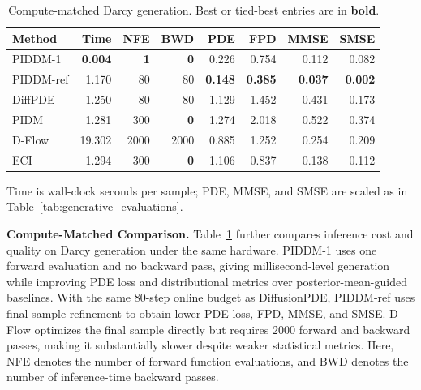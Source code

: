 \documentclass{article}
\theoremstyle{plain}
\theoremstyle{definition}
\theoremstyle{remark}
\begin{document}
\begin{table}[t]
\centering
\renewcommand{\arraystretch}{1.08}
\caption{Compute-matched Darcy generation. Best or tied-best entries are in \textbf{bold}.}
\label{tab:compute_matched}
\begin{tabular}{@{}lrrrrrrr@{}}
\toprule
Method & Time & NFE & BWD & PDE & FPD & MMSE & SMSE \\
\midrule
PIDDM-1 & \bfseries 0.004 & \bfseries 1 & \bfseries 0 & 0.226 & 0.754 & 0.112 & 0.082 \\
PIDDM-ref & 1.170 & 80 & 80 & \bfseries 0.148 & \bfseries 0.385 & \bfseries 0.037 & \bfseries 0.002 \\
DiffPDE & 1.250 & 80 & 80 & 1.129 & 1.452 & 0.431 & 0.173 \\
PIDM & 1.281 & 300 & \bfseries 0 & 1.274 & 2.018 & 0.522 & 0.374 \\
D-Flow & 19.302 & 2000 & 2000 & 0.885 & 1.252 & 0.254 & 0.209 \\
ECI & 1.294 & 300 & \bfseries 0 & 1.106 & 0.837 & 0.138 & 0.112 \\
\bottomrule
\end{tabular}
\par\vspace{1mm}
\begin{minipage}{\columnwidth}
\footnotesize Time is wall-clock seconds per sample; PDE, MMSE, and SMSE are scaled as in Table~\ref{tab:generative_evaluations}.
\end{minipage}
\end{table}

\noindent\textbf{Compute-Matched Comparison.}
Table~\ref{tab:compute_matched} further compares inference cost and quality on Darcy generation under the same hardware. PIDDM-1 uses one forward evaluation and no backward pass, giving millisecond-level generation while improving PDE loss and distributional metrics over posterior-mean-guided baselines. With the same 80-step online budget as DiffusionPDE, PIDDM-ref uses final-sample refinement to obtain lower PDE loss, FPD, MMSE, and SMSE. D-Flow optimizes the final sample directly but requires 2000 forward and backward passes, making it substantially slower despite weaker statistical metrics.
Here, NFE denotes the number of forward function evaluations, and BWD denotes the number of inference-time backward passes.
\end{document}
